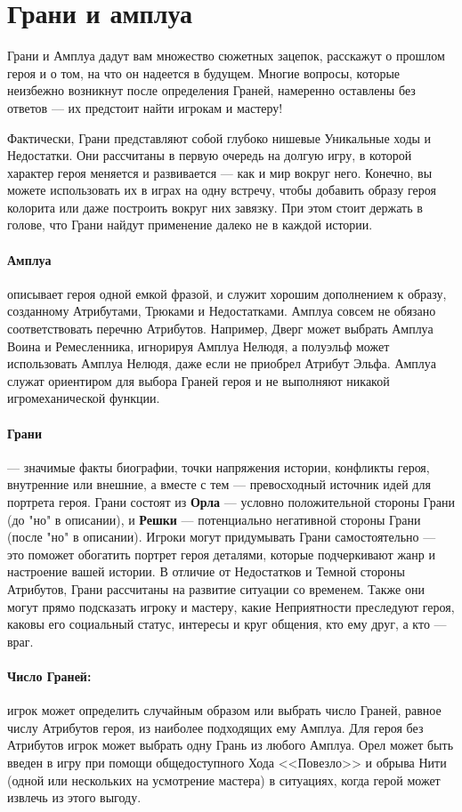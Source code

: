 \section{Грани и амплуа}
Грани и Амплуа дадут вам множество сюжетных зацепок, расскажут о прошлом героя и о том, на что он надеется в будущем. Многие вопросы, которые неизбежно возникнут после определения Граней, намеренно оставлены без ответов — их предстоит найти игрокам и мастеру!
\begin{tcolorbox}
Фактически, Грани представляют собой глубоко нишевые Уникальные ходы и Недостатки. Они рассчитаны в первую очередь на долгую игру, в которой характер героя меняется и развивается — как и мир вокруг него. Конечно, вы можете использовать их в играх на одну встречу, чтобы добавить образу героя колорита или даже построить вокруг них завязку. При этом стоит держать в голове, что Грани найдут применение далеко не в каждой истории.
\end{tcolorbox}
\paragraph{Амплуа} описывает героя одной емкой фразой, и служит хорошим дополнением к образу, созданному Атрибутами, Трюками и Недостатками. Амплуа совсем не обязано соответствовать перечню Атрибутов. Например, Дверг может выбрать Амплуа Воина и Ремесленника, игнорируя Амплуа Нелюдя, а полуэльф может использовать Амплуа Нелюдя, даже если не приобрел Атрибут Эльфа. Амплуа служат ориентиром для выбора Граней героя и не выполняют никакой игромеханической функции.
\paragraph{Грани} — значимые факты биографии, точки напряжения истории, конфликты героя, внутренние или внешние, а вместе с тем — превосходный источник идей для портрета героя. Грани состоят из \textbf{Орла} — условно положительной стороны Грани (до "но" в описании), и \textbf{Решки} — потенциально негативной стороны Грани (после "но" в описании). Игроки могут придумывать Грани самостоятельно — это поможет обогатить портрет героя деталями, которые подчеркивают жанр и настроение вашей истории.
В отличие от Недостатков и Темной стороны Атрибутов, Грани
рассчитаны на развитие ситуации со временем. Также они могут
прямо подсказать игроку и мастеру, какие Неприятности преследуют героя, каковы его социальный статус, интересы и круг общения, кто ему друг, а кто — враг.
\paragraph{Число Граней:} игрок может определить случайным образом или выбрать число Граней, равное числу Атрибутов героя, из наиболее подходящих ему Амплуа. Для героя без Атрибутов игрок может выбрать одну Грань из любого Амплуа. Орел может быть введен в игру при помощи общедоступного Хода
<<Повезло>> и обрыва Нити (одной или нескольких на усмотрение мастера) в ситуациях, когда герой может извлечь из этого выгоду.
